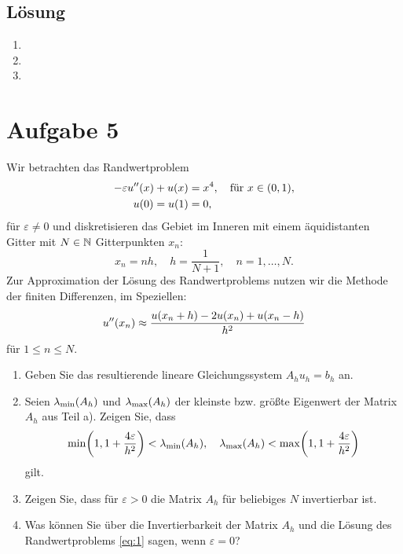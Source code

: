 \documentclass{exercise}
\begin{document}
    \subsection*{Lösung}
    \begin{enumerate}
        \item
        \item
        \item
    \end{enumerate}


    \section*{Aufgabe 5}

    \begin{problem}
        Wir betrachten das Randwertproblem
        \begin{align}
            -\varepsilon u''\parentheses*{x} + u\parentheses*{x} &= x^4, \quad \text{für }x \in \parentheses*{0, 1},\label{eq:1}\\
            u\parentheses*{0} = u\parentheses*{1} &= 0,\nonumber
        \end{align}
        für \(\varepsilon \ne 0\) und diskretisieren das Gebiet im Inneren mit einem äquidistanten Gitter mit \(N \in \mathbb{N}\) Gitterpunkten \(x_n\):
        \[
            x_n = nh, \quad h = \frac{1}{N + 1}, \quad n = 1, \ldots, N.
        \]
        Zur Approximation der Lösung des Randwertproblems nutzen wir die Methode der finiten Differenzen, im Speziellen:
        \[
            u''\parentheses*{x_n} \approx \frac{u\parentheses*{x_n + h} - 2u\parentheses*{x_n} + u\parentheses*{x_n - h}}{h^2}
        \]
        für \(1 \le n \le N\).
        \begin{enumerate}
            \item Geben Sie das resultierende lineare Gleichungssystem \(A_h u_h = b_h\) an.
            \item Seien \(\lambda_{\text{min}}\parentheses*{A_h}\) und \(\lambda_{\text{max}}\parentheses*{A_h}\) der kleinste bzw. größte Eigenwert der Matrix \(A_h\) aus Teil a).
            Zeigen Sie, dass
            \[
                \min\parentheses*{1, 1 + \frac{4\varepsilon}{h^2}} < \lambda_{\text{min}}\parentheses*{A_h}, \quad \lambda_{\text{max}}\parentheses*{A_h} < \max\parentheses*{1, 1 + \frac{4\varepsilon}{h^2}}
            \]
            gilt.
            \item Zeigen Sie, dass für \(\varepsilon > 0\) die Matrix \(A_h\) für beliebiges \(N\) invertierbar ist.
            \item Was können Sie über die Invertierbarkeit der Matrix \(A_h\) und die Lösung des Randwertproblems \eqref{eq:1} sagen, wenn \(\varepsilon = 0\)?
        \end{enumerate}


\end{problem}
\end{document}
